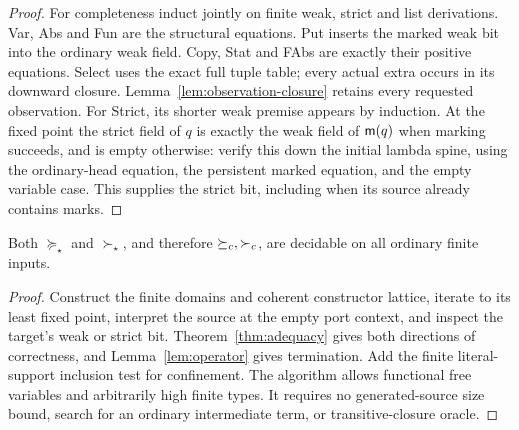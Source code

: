 \begin{proof}
For completeness induct jointly on finite weak, strict and list
derivations. Var, Abs and Fun are the structural equations. Put inserts
the marked weak bit into the ordinary weak field. Copy, Stat and FAbs
are exactly their positive equations. Select uses the exact full tuple
table; every actual extra occurs in its downward closure.
Lemma~\ref{lem:observation-closure} retains every requested observation.
For Strict, its shorter weak premise appears by induction. At the fixed
point the strict field of $q$ is exactly the weak field of $\mathsf m(q)$
when marking succeeds, and is empty otherwise: verify this down the
initial lambda spine, using the ordinary-head equation, the persistent
marked equation, and the empty variable case. This supplies the strict
bit, including when its source already contains marks.
\end{proof}

\begin{theorem}[Decidability]\label{thm:decide}
Both $\succeq_\star$ and $\succ_\star$, and therefore $\succeq_c,\succ_c$, are
decidable on all ordinary finite inputs.
\end{theorem}
\begin{proof}
Construct the finite domains and coherent constructor lattice, iterate
to its least fixed point, interpret the source at the empty port context,
and inspect the target's weak or strict bit. Theorem~\ref{thm:adequacy}
gives both directions of correctness, and Lemma~\ref{lem:operator} gives
termination. Add the finite literal-support inclusion test for confinement.
The algorithm allows functional free variables and arbitrarily high
finite types. It requires no generated-source size bound, search for an
ordinary intermediate term, or transitive-closure oracle.
\end{proof}
